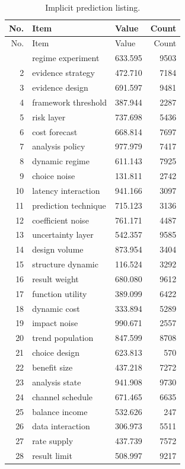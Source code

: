 \documentclass[11pt]{report}
\begin{document}
\begin{longtable}{rllr}\caption{Implicit prediction listing.}\label{tab:l10}\\\toprule No. & Item & Value & Count \\ \midrule \endfirsthead\toprule No. & Item & Value & Count \\ \midrule \endhead\bottomrule \endfoot
1 & regime experiment & 633.595 & 9503 \\
2 & evidence strategy & 472.710 & 7184 \\
3 & evidence design & 691.597 & 9481 \\
4 & framework threshold & 387.944 & 2287 \\
5 & risk layer & 737.698 & 5436 \\
6 & cost forecast & 668.814 & 7697 \\
7 & analysis policy & 977.979 & 7417 \\
8 & dynamic regime & 611.143 & 7925 \\
9 & choice noise & 131.811 & 2742 \\
10 & latency interaction & 941.166 & 3097 \\
11 & prediction technique & 715.123 & 3136 \\
12 & coefficient noise & 761.171 & 4487 \\
13 & uncertainty layer & 542.357 & 9585 \\
14 & design volume & 873.954 & 3404 \\
15 & structure dynamic & 116.524 & 3292 \\
16 & result weight & 680.080 & 9612 \\
17 & function utility & 389.099 & 6422 \\
18 & dynamic cost & 333.894 & 5289 \\
19 & impact noise & 990.671 & 2557 \\
20 & trend population & 847.599 & 8708 \\
21 & choice design & 623.813 & 570 \\
22 & benefit size & 437.218 & 7272 \\
23 & analysis state & 941.908 & 9730 \\
24 & channel schedule & 671.465 & 6635 \\
25 & balance income & 532.626 & 247 \\
26 & data interaction & 306.973 & 5511 \\
27 & rate supply & 437.739 & 7572 \\
28 & result limit & 508.997 & 9217 \\

\end{longtable}
\end{document}
